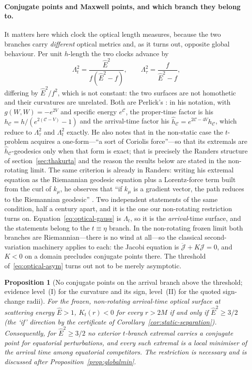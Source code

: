 \documentclass[12pt]{iopart}
\theoremstyle{plain}
\newtheorem{proposition}{Proposition}
\theoremstyle{definition}
\theoremstyle{remark}
\newcommand{\Ehat}{\hat E}
\begin{document}
\paragraph{Conjugate points and Maxwell points, and which branch they belong to.}
It matters here which clock the optical length measures, because the two branches
carry \emph{different} optical metrics and, as it turns out, opposite global
behaviour. Per unit $h$-length the two clocks advance by
\begin{equation}
    \Lambda_t^2=\frac{\Ehat^2}{f(\Ehat^2-f)},
    \qquad
    \Lambda_\tau^2=\frac{f}{\Ehat^2-f},
    \label{eq:two-lambdas}
\end{equation}
differing by $\Ehat^2/f^2$, which is not constant: the two surfaces are not
homothetic and their curvatures are unrelated. Both are Perlick's
\cite{Perlick1991}: in his notation, with $g(W,W)=-e^{2V}$ and specific energy
$e^{\mathcal C}$, the proper-time factor is his $h_{\mathcal C}
=h/(e^{2(\mathcal C-V)}-1)$ and the arrival-time factor his
$\hat h_{\mathcal C}=e^{2\mathcal C-4V}h_{\mathcal C}$, which reduce to
$\Lambda_\tau^2$ and $\Lambda_t^2$ exactly. He also notes that in the
non-static case the $t$-problem acquires a one-form---``a sort of Coriolis
force''---so that its extremals are $\hat h_{\mathcal C}$-geodesics only when
that form is exact; that is precisely the Randers structure of
section~\ref{sec:thakurta} and the reason the results below are stated in the
non-rotating limit. The same criterion is already in Randers: writing his extremal
equation as the Riemannian geodesic equation plus a Lorentz-force term built from
the curl of $k_\mu$, he observes that ``if $k_\mu$ is a gradient vector, the path
reduces to the Riemannian geodesic'' \cite[Eqs.~(13)--(14)]{Randers1941}. Two
independent statements of the same condition, half a century apart, and it is the
one our non-rotating restriction turns on. Equation~\eqref{eq:optical-gauss} is $\Lambda_t$, so it is
the \emph{arrival}-time surface, and the statements belong to the
$t\equiv\eta$ branch. In the non-rotating
frozen limit both branches are Riemannian---there is no wind at all---so the
classical second-variation machinery applies to each: the Jacobi equation is
$\ddot{\mathcal J}+K\mathcal J=0$, and $K<0$ on a domain precludes conjugate
points there. The threshold of~\eqref{eq:optical-asym} turns out not to be merely
asymptotic.

\begin{proposition}[No conjugate points on the arrival branch above the
threshold; evidence level~(I) for the curvature and its sign, level~(II) for the
quoted sign-change radii]
\label{prop:noconj}
For the frozen, non-rotating \emph{arrival-time} optical surface at scattering energy
$\Ehat>1$, $K_t(r)<0$ for \emph{every} $r>2M$ if and only if $\Ehat^2\ge3/2$ (the `if' direction
by the certificate of Corollary~\ref{cor:static-separation}). Consequently,
for $\Ehat^2\ge3/2$ no exterior $t$-branch extremal carries a conjugate point
\emph{for equatorial perturbations}, and every such extremal is a local minimiser
of the arrival time among equatorial competitors. The restriction is necessary
and is discussed after Proposition~\ref{prop:globalmin}.
\end{proposition}
\end{document}
